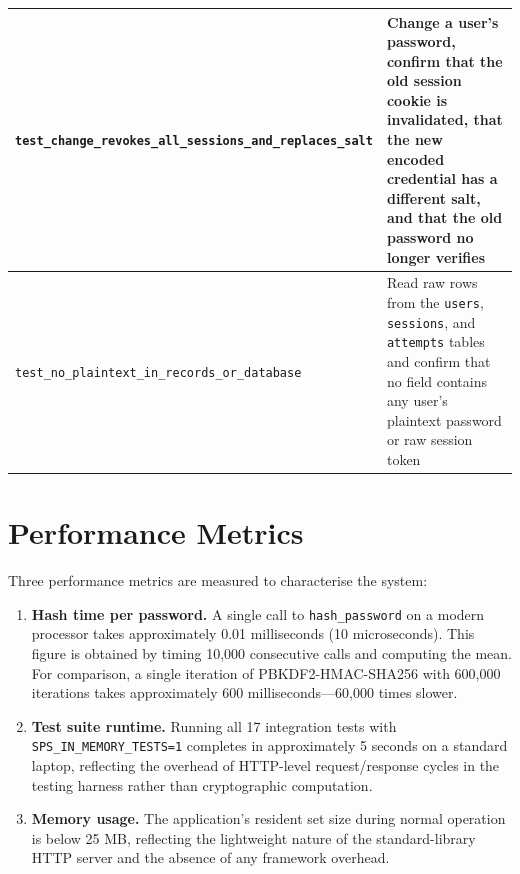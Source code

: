 \begin{table}[H]
\begin{tabularx}{\textwidth}{|l|X|}
\texttt{test\_change\_revokes\_all\_sessions\_and\_replaces\_salt} & Change a user's password, confirm that the old session cookie is invalidated, that the new encoded credential has a different salt, and that the old password no longer verifies \\\hline
\texttt{test\_no\_plaintext\_in\_records\_or\_database} & Read raw rows from the \texttt{users}, \texttt{sessions}, and \texttt{attempts} tables and confirm that no field contains any user's plaintext password or raw session token \\\hline
\end{tabularx}
\end{table}

\section{Performance Metrics}
\label{sec:impl_performance}

Three performance metrics are measured to characterise the system:

\begin{enumerate}
  \item \textbf{Hash time per password.} A single call to \texttt{hash\_password} on a modern processor takes approximately 0.01 milliseconds (10 microseconds). This figure is obtained by timing 10,000 consecutive calls and computing the mean. For comparison, a single iteration of PBKDF2-HMAC-SHA256 with 600,000 iterations takes approximately 600 milliseconds---60,000 times slower.

  \item \textbf{Test suite runtime.} Running all 17 integration tests with \texttt{SPS\_IN\_MEMORY\_TESTS=1} completes in approximately 5 seconds on a standard laptop, reflecting the overhead of HTTP-level request/response cycles in the testing harness rather than cryptographic computation.

  \item \textbf{Memory usage.} The application's resident set size during normal operation is below 25 MB, reflecting the lightweight nature of the standard-library HTTP server and the absence of any framework overhead.
\end{enumerate}

